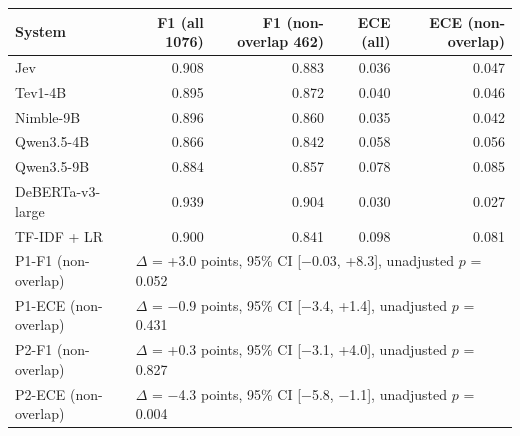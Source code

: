 \begin{tabular}{lrrrr}
\toprule
System & F1 (all 1076) & F1 (non-overlap 462) & ECE (all) & ECE (non-overlap) \\
\midrule
Jev & 0.908 & 0.883 & 0.036 & 0.047 \\
Tev1-4B & 0.895 & 0.872 & 0.040 & 0.046 \\
Nimble-9B & 0.896 & 0.860 & 0.035 & 0.042 \\
Qwen3.5-4B & 0.866 & 0.842 & 0.058 & 0.056 \\
Qwen3.5-9B & 0.884 & 0.857 & 0.078 & 0.085 \\
DeBERTa-v3-large & 0.939 & 0.904 & 0.030 & 0.027 \\
TF-IDF + LR & 0.900 & 0.841 & 0.098 & 0.081 \\
\midrule
P1-F1 (non-overlap) & \multicolumn{4}{l}{$\Delta$ = +3.0 points, 95\% CI [$-$0.03, +8.3], unadjusted $p$ = 0.052} \\
P1-ECE (non-overlap) & \multicolumn{4}{l}{$\Delta$ = $-$0.9 points, 95\% CI [$-$3.4, +1.4], unadjusted $p$ = 0.431} \\
P2-F1 (non-overlap) & \multicolumn{4}{l}{$\Delta$ = +0.3 points, 95\% CI [$-$3.1, +4.0], unadjusted $p$ = 0.827} \\
P2-ECE (non-overlap) & \multicolumn{4}{l}{$\Delta$ = $-$4.3 points, 95\% CI [$-$5.8, $-$1.1], unadjusted $p$ = 0.004} \\
\bottomrule
\end{tabular}
